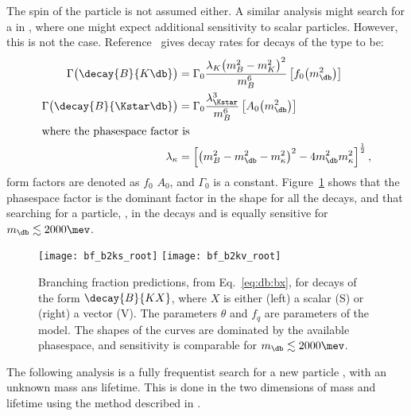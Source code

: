 The spin of the particle is not assumed either.
A similar analysis might search for a \db in \decay{\Bp}{\Kp\mumu}, where one might expect
additional sensitivity to scalar particles.
However, this is not the case.
Reference~\cite{Batell:2009jf} gives decay rates for decays of the type  to be:
\begin{align}
  \Gamma\big(\decay{B}{K\db}\big) &= \Gamma_0
  \frac{\lambda_{K}\big(m_{B}^2-m_{K}^2\big)^2}{m_{B}^6}
  \left[f_0\!\left(m_\db^2\right)\right]
  \\
  \Gamma\big(\decay{B}{\Kstar\db}\big) &= \Gamma_0
  \frac{\lambda_{\Kstar}^3}{m_{B}^6}
  \left[A_0\!\left(m_\db^2\right)\right]
  \\
  \intertext{where the phasespace factor is}
  \lambda_\kappa &= \left[
    \left( m_B^2 - m_\db^2 - m_\kappa^2 \right)^2
    -4m_\db^2m_\kappa^2
    \right]^\frac12,
    \label{eq:db:bx}
\end{align}
form factors are denoted as $f_0$ $A_0$, and $\Gamma_0$  is a constant.
Figure~\ref{fig:db:kx} shows that the phasespace factor is the dominant factor in the shape for all
the decays, and that searching for a particle, \db, in the decays \decay{\Bd}{\Kstarz\db} and
\decay{\Bp}{\Kp\db} is equally sensitive for $m_\db\lesssim2000\mev$.


\begin{figure}
  \begin{center}
    \texttt{[image: bf\_b2ks\_root]}
    \texttt{[image: bf\_b2kv\_root]}
    \caption{
      Branching fraction predictions, from Eq.~\protect\ref{eq:db:bx},
      for decays of the form $\decay{B}{KX}$, where $X$ is either
      (left) a scalar (S) or
      (right) a vector (V).
      The parameters $\theta$ and $f_q$ are parameters of the model.
      The shapes of the curves are dominated by the available phasespace, and sensitivity is
      comparable for $m_\db\lesssim2000\mev$.
    }
    \label{fig:db:kx}
  \end{center}
\end{figure}


The following analysis is a fully frequentist search for a new particle \db, with an unknown mass
ans lifetime.
This is done in the two dimensions of mass and lifetime using the method described in
.


